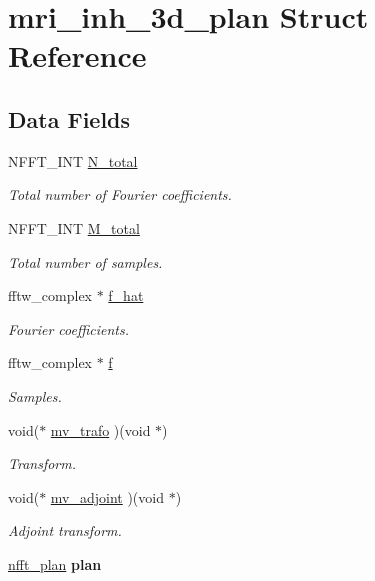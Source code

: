 \hypertarget{structmri__inh__3d__plan}{\section{mri\-\_\-inh\-\_\-3d\-\_\-plan Struct Reference}
\label{structmri__inh__3d__plan}
}
\subsection*{Data Fields}
\begin{DoxyCompactItemize}
\item 
N\-F\-F\-T\-\_\-\-I\-N\-T \hyperlink{structmri__inh__3d__plan_abe6874af3f51df4ea117d9c92cf925a1}{N\-\_\-total}
\begin{DoxyCompactList}\small\item\em Total number of Fourier coefficients. \end{DoxyCompactList}\item 
N\-F\-F\-T\-\_\-\-I\-N\-T \hyperlink{structmri__inh__3d__plan_a59d7ad3bea791ad7c2c6a808fc1e40fe}{M\-\_\-total}
\begin{DoxyCompactList}\small\item\em Total number of samples. \end{DoxyCompactList}\item 
fftw\-\_\-complex $\ast$ \hyperlink{structmri__inh__3d__plan_a91ed30b213dea4954d2d27c4d1334a50}{f\-\_\-hat}
\begin{DoxyCompactList}\small\item\em Fourier coefficients. \end{DoxyCompactList}\item 
fftw\-\_\-complex $\ast$ \hyperlink{structmri__inh__3d__plan_a9e51f5f4ad46d4b120c452fc962a2385}{f}
\begin{DoxyCompactList}\small\item\em Samples. \end{DoxyCompactList}\item 
void($\ast$ \hyperlink{structmri__inh__3d__plan_a780818802d5bfdc4d4174a3637254fd5}{mv\-\_\-trafo} )(void $\ast$)
\begin{DoxyCompactList}\small\item\em Transform. \end{DoxyCompactList}\item 
void($\ast$ \hyperlink{structmri__inh__3d__plan_afa2e143e704b701e9a0ee1d795f46b5b}{mv\-\_\-adjoint} )(void $\ast$)
\begin{DoxyCompactList}\small\item\em Adjoint transform. \end{DoxyCompactList}\item 
\hypertarget{structmri__inh__3d__plan_ac8386842f48b212c4132a3b151d73402}{\hyperlink{structnfft__plan}{nfft\-\_\-plan} {\bfseries plan}}\label{structmri__inh__3d__plan_ac8386842f48b212c4132a3b151d73402}


\end{DoxyCompactItemize}
